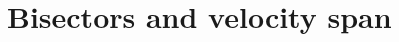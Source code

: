 \documentclass{/Users/art2/TeX/aanda/aa}
\def\kms {km\,s$^{-1}$}
\begin{document}

\section{Bisectors and velocity span}
\end{document}

